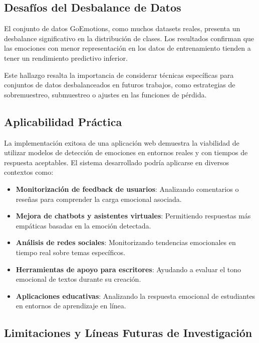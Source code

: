 \documentclass[12pt,a4paper]{report}
\begin{document}
\subsection{Desafíos del Desbalance de Datos}

El conjunto de datos GoEmotions, como muchos datasets reales, presenta un desbalance significativo en la distribución de clases. Los resultados confirman que las emociones con menor representación en los datos de entrenamiento tienden a tener un rendimiento predictivo inferior.

Este hallazgo resalta la importancia de considerar técnicas específicas para conjuntos de datos desbalanceados en futuros trabajos, como estrategias de sobremuestreo, submuestreo o ajustes en las funciones de pérdida.

\subsection{Aplicabilidad Práctica}

La implementación exitosa de una aplicación web demuestra la viabilidad de utilizar modelos de detección de emociones en entornos reales y con tiempos de respuesta aceptables. El sistema desarrollado podría aplicarse en diversos contextos como:

\begin{itemize}
  \item \textbf{Monitorización de feedback de usuarios}: Analizando comentarios o reseñas para comprender la carga emocional asociada.
  \item \textbf{Mejora de chatbots y asistentes virtuales}: Permitiendo respuestas más empáticas basadas en la emoción detectada.
  \item \textbf{Análisis de redes sociales}: Monitorizando tendencias emocionales en tiempo real sobre temas específicos.
  \item \textbf{Herramientas de apoyo para escritores}: Ayudando a evaluar el tono emocional de textos durante su creación.
  \item \textbf{Aplicaciones educativas}: Analizando la respuesta emocional de estudiantes en entornos de aprendizaje en línea.
\end{itemize}

\subsection{Limitaciones y Líneas Futuras de Investigación}
\end{document}
